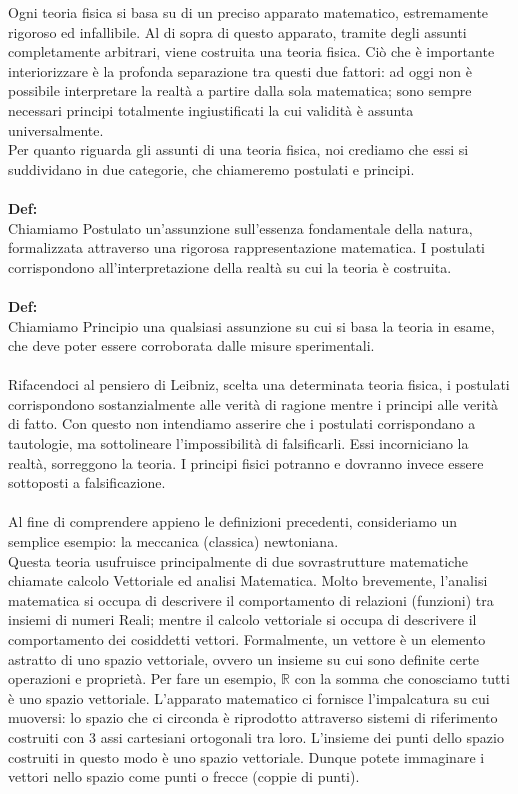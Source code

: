\documentclass[]{article}
\begin{document}
	Ogni teoria fisica si basa su di un preciso apparato matematico, estremamente rigoroso ed infallibile. Al di sopra di questo apparato, tramite degli assunti completamente arbitrari, viene costruita una teoria fisica. Ciò che è importante interiorizzare è la profonda separazione tra questi due fattori: ad oggi non è possibile interpretare la realtà a partire dalla sola matematica; sono sempre necessari principi totalmente ingiustificati la cui validità è assunta universalmente.\\
	Per quanto riguarda gli assunti di una teoria fisica, noi crediamo che essi si suddividano in due categorie, che chiameremo postulati e principi.\\
	\\
	\textbf{Def:}\\
	Chiamiamo Postulato un'assunzione sull'essenza fondamentale della natura, formalizzata attraverso una rigorosa rappresentazione matematica. I postulati corrispondono all'interpretazione della realtà su cui la teoria è costruita.
	\\
	\\
	\textbf{Def:}\\
	Chiamiamo Principio una qualsiasi assunzione su cui si basa la teoria in esame, che deve poter essere corroborata dalle misure sperimentali.
	\\
	\\
	Rifacendoci al pensiero di Leibniz, scelta una determinata teoria fisica, i postulati corrispondono sostanzialmente alle verità di ragione mentre i principi alle verità di fatto. Con questo non intendiamo asserire che i postulati corrispondano a tautologie, ma sottolineare l'impossibilità di falsificarli. Essi incorniciano la realtà, sorreggono la teoria. I principi fisici potranno e dovranno invece essere sottoposti a falsificazione.\\
	\\
	Al fine di comprendere appieno le definizioni precedenti, consideriamo un semplice esempio: la meccanica (classica) newtoniana.\\
	Questa teoria usufruisce principalmente di due sovrastrutture matematiche chiamate calcolo Vettoriale ed analisi Matematica. Molto brevemente, l'analisi matematica si occupa di descrivere il comportamento di relazioni (funzioni) tra insiemi di numeri Reali; mentre il calcolo vettoriale si occupa di descrivere il comportamento dei cosiddetti vettori. Formalmente, un vettore è un elemento astratto di uno spazio vettoriale, ovvero un insieme su cui sono definite certe operazioni e proprietà. Per fare un esempio, $\mathbb{R}$ con la somma che conosciamo tutti è uno spazio vettoriale. L'apparato matematico ci fornisce l'impalcatura su cui muoversi: lo spazio che ci circonda è riprodotto attraverso sistemi di riferimento costruiti con 3 assi cartesiani ortogonali tra loro. L'insieme dei punti dello spazio costruiti in questo modo è uno spazio vettoriale. Dunque potete immaginare i vettori nello spazio come punti o frecce (coppie di punti). \\
\end{document}
